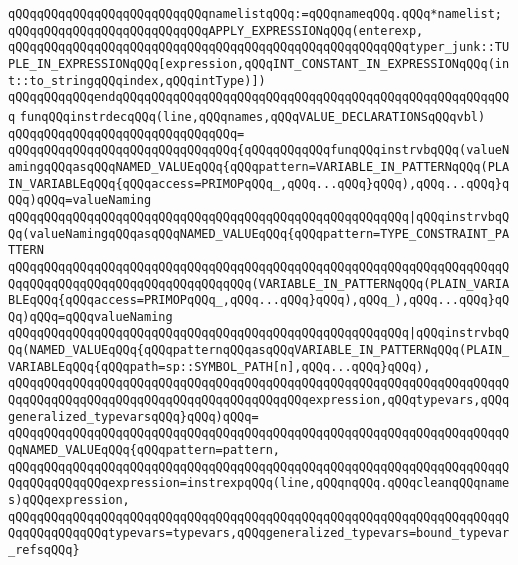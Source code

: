 \verb|qQQqqQQqqQQqqQQqqQQqqQQqqQQqnamelistqQQq:=qQQqnameqQQq.qQQq*namelist;|\newline
\verb|qQQqqQQqqQQqqQQqqQQqqQQqqQQqAPPLY_EXPRESSIONqQQq(enterexp,|\newline
\verb|qQQqqQQqqQQqqQQqqQQqqQQqqQQqqQQqqQQqqQQqqQQqqQQqqQQqqQQqtyper_junk::TUPLE_IN_EXPRESSIONqQQq[expression,qQQqINT_CONSTANT_IN_EXPRESSIONqQQq(int::to_stringqQQqindex,qQQqintType)])|\newline
\verb|qQQqqQQqqQQqendqQQqqQQqqQQqqQQqqQQqqQQqqQQqqQQqqQQqqQQqqQQqqQQqqQQqqQQq|\newline
\newline
\verb|funqQQqinstrdecqQQq(line,qQQqnames,qQQqVALUE_DECLARATIONSqQQqvbl)|\newline
\verb|qQQqqQQqqQQqqQQqqQQqqQQqqQQqqQQq=|\newline
\verb|qQQqqQQqqQQqqQQqqQQqqQQqqQQqqQQq{qQQqqQQqqQQqfunqQQqinstrvbqQQq(valueNamingqQQqasqQQqNAMED_VALUEqQQq{qQQqpattern=VARIABLE_IN_PATTERNqQQq(PLAIN_VARIABLEqQQq{qQQqaccess=PRIMOPqQQq_,qQQq...qQQq}qQQq),qQQq...qQQq}qQQq)qQQq=valueNaming|\newline
\verb|qQQqqQQqqQQqqQQqqQQqqQQqqQQqqQQqqQQqqQQqqQQqqQQqqQQqqQQq|\verb#|qQQqinstrvbqQQq(valueNamingqQQqasqQQqNAMED_VALUEqQQq{qQQqpattern=TYPE_CONSTRAINT_PATTERN#\newline
\verb|qQQqqQQqqQQqqQQqqQQqqQQqqQQqqQQqqQQqqQQqqQQqqQQqqQQqqQQqqQQqqQQqqQQqqQQqqQQqqQQqqQQqqQQqqQQqqQQqqQQqqQQq(VARIABLE_IN_PATTERNqQQq(PLAIN_VARIABLEqQQq{qQQqaccess=PRIMOPqQQq_,qQQq...qQQq}qQQq),qQQq_),qQQq...qQQq}qQQq)qQQq=qQQqvalueNaming|\newline
\verb|qQQqqQQqqQQqqQQqqQQqqQQqqQQqqQQqqQQqqQQqqQQqqQQqqQQqqQQq|\verb#|qQQqinstrvbqQQq(NAMED_VALUEqQQq{qQQqpatternqQQqasqQQqVARIABLE_IN_PATTERNqQQq(PLAIN_VARIABLEqQQq{qQQqpath=sp::SYMBOL_PATH[n],qQQq...qQQq}qQQq),#\newline
\verb|qQQqqQQqqQQqqQQqqQQqqQQqqQQqqQQqqQQqqQQqqQQqqQQqqQQqqQQqqQQqqQQqqQQqqQQqqQQqqQQqqQQqqQQqqQQqqQQqqQQqqQQqqQQqqQQqexpression,qQQqtypevars,qQQqgeneralized_typevarsqQQq}qQQq)qQQq=|\newline
\verb|qQQqqQQqqQQqqQQqqQQqqQQqqQQqqQQqqQQqqQQqqQQqqQQqqQQqqQQqqQQqqQQqqQQqqQQqNAMED_VALUEqQQq{qQQqpattern=pattern,|\newline
\verb|qQQqqQQqqQQqqQQqqQQqqQQqqQQqqQQqqQQqqQQqqQQqqQQqqQQqqQQqqQQqqQQqqQQqqQQqqQQqqQQqqQQqexpression=instrexpqQQq(line,qQQqnqQQq.qQQqcleanqQQqnames)qQQqexpression,|\newline
\verb|qQQqqQQqqQQqqQQqqQQqqQQqqQQqqQQqqQQqqQQqqQQqqQQqqQQqqQQqqQQqqQQqqQQqqQQqqQQqqQQqqQQqtypevars=typevars,qQQqgeneralized_typevars=bound_typevar_refsqQQq}|\newline
